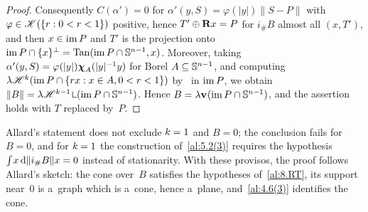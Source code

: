 \begin{proof}
    Consequently $C(\alpha') = 0$ for $\alpha'(y,S) = \varphi(|y|) \|S - P\|$ with $\varphi \in
    \mathscr{K}(\{ r : 0 < r < 1 \})$ positive, hence $T' \oplus \mathbf{R} x = P$ for $i_\# B$ almost all
    $(x,T')$, and then $x \in \operatorname{im} P$ and $T'$ is the projection onto $\operatorname{im} P \cap \{ x \}^\perp =
    \operatorname{Tan}(\operatorname{im} P \cap \mathbb{S}^{n-1}, x)$. Moreover, taking $\alpha'(y,S) = \varphi(|y|)
    \boldsymbol{\chi}_{A}(|y|^{-1} y)$ for Borel $A \subseteq \mathbb{S}^{n-1}$, and computing $\lambda
    \mathscr{H}^{k}(\operatorname{im} P \cap \{ r x : x \in A, 0 < r < 1 \})$ by~\cite[3.2.13]{Federer1969} in $\operatorname{im} P$,
    we obtain $\|B\| = \lambda \HM^{\vdim-1} \restrict (\im P \cap \sphere{\adim-1})$. Hence $B =
    \lambda \mathbf{v}_{}(\operatorname{im} P \cap \mathbb{S}^{n-1})$, and the assertion holds with $T$ replaced by~$P$.
\end{proof}

\begin{remark}
    \label{rem:8.1(5)}
    Allard's statement does not exclude $k = 1$ and $B = 0$; the conclusion fails for $B = 0$,
    and for $k = 1$ the construction of~\ref{al:5.2(3)} requires the hypothesis ${\textstyle\int_{}^{}} x
    \,\mathrm{d} \|i_\# B\| x = 0$ instead of stationarity. With these provisos, the proof follows Allard's
    sketch: the cone over~$B$ satisfies the hypotheses of~\ref{al:8.RT}, its support near~$0$ is
    a~graph which is a~cone, hence a~plane, and~\ref{al:4.6(3)} identifies the cone.
\end{remark}
